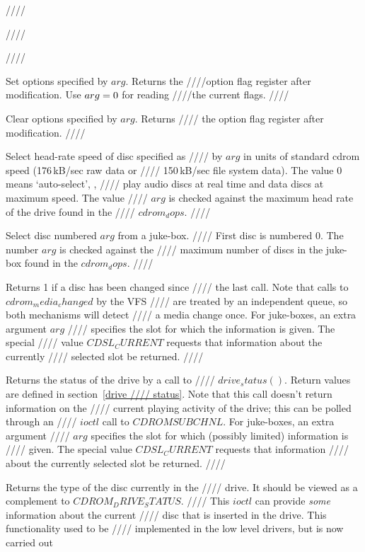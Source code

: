 ////\documentclass{article}
\begin{document}
////\begin{description}
////\item[CDROM_SET_OPTIONS] Set options specified by $arg$. Returns the
////option flag register after modification. Use  $arg = \rm0$ for reading
////the current flags.
////\item[CDROM_CLEAR_OPTIONS] Clear options specified by $arg$. Returns
////  the option flag register after modification.
////\item[CDROM_SELECT_SPEED] Select head-rate speed of disc specified as
////  by $arg$ in units of standard cdrom speed (176\,kB/sec raw data or
////  150\,kB/sec file system data). The value 0 means `auto-select', \ie,
////  play audio discs at real time and data discs at maximum speed. The value
////  $arg$ is checked against the maximum head rate of the drive found in the
////  $cdrom_dops$.
////\item[CDROM_SELECT_DISC] Select disc numbered $arg$ from a juke-box.
////  First disc is numbered 0. The number $arg$ is checked against the
////  maximum number of discs in the juke-box found in the $cdrom_dops$.
////\item[CDROM_MEDIA_CHANGED] Returns 1 if a disc has been changed since
////  the last call. Note that calls to $cdrom_media_changed$ by the VFS
////  are treated by an independent queue, so both mechanisms will detect
////  a media change once. For juke-boxes, an extra argument $arg$
////  specifies the slot for which the information is given. The special
////  value $CDSL_CURRENT$ requests that information about the currently
////  selected slot be returned.
////\item[CDROM_DRIVE_STATUS] Returns the status of the drive by a call to
////  $drive_status()$. Return values are defined in section~\ref{drive
////   status}. Note that this call doesn't return information on the
////  current playing activity of the drive; this can be polled through an
////  $ioctl$ call to $CDROMSUBCHNL$. For juke-boxes, an extra argument
////  $arg$ specifies the slot for which (possibly limited) information is
////  given. The special value $CDSL_CURRENT$ requests that information
////  about the currently selected slot be returned.
////\item[CDROM_DISC_STATUS] Returns the type of the disc currently in the
////  drive.  It should be viewed as a complement to $CDROM_DRIVE_STATUS$.
////  This $ioctl$ can provide \emph {some} information about the current
////  disc that is inserted in the drive.  This functionality used to be
////  implemented in the low level drivers, but is now carried out

\end{description}
\end{document}

